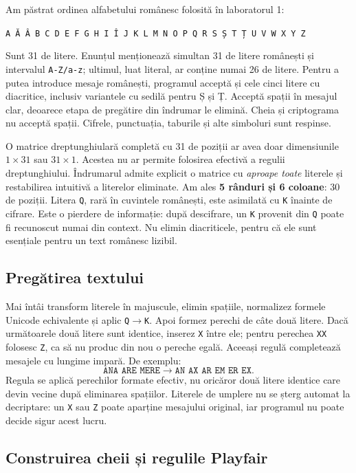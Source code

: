 \documentclass[12pt,a4paper]{article}
\begin{document}
Am păstrat ordinea alfabetului românesc folosită în laboratorul 1:
\begin{center}
\small\texttt{A Ă Â B C D E F G H I Î J K L M N O P Q R S Ș T Ț U V W X Y Z}
\end{center}
Sunt 31 de litere. Enunțul menționează simultan 31 de litere românești și intervalul
\texttt{A-Z/a-z}; ultimul, luat literal, ar conține numai 26 de litere. Pentru a putea
introduce mesaje românești, programul acceptă și cele cinci litere cu diacritice,
inclusiv variantele cu sedilă pentru Ș și Ț. Acceptă spații în mesajul clar,
deoarece etapa de pregătire din îndrumar le elimină. Cheia și criptograma nu
acceptă spații. Cifrele, punctuația, taburile și alte simboluri sunt respinse.

O matrice dreptunghiulară completă cu 31 de poziții ar avea doar dimensiunile
$1\times31$ sau $31\times1$. Acestea nu ar permite folosirea efectivă a regulii
dreptunghiului. Îndrumarul admite explicit o matrice cu \emph{aproape toate}
literele și restabilirea intuitivă a literelor eliminate. Am ales \textbf{5 rânduri
și 6 coloane}: 30 de poziții. Litera \texttt{Q}, rară în cuvintele românești,
este asimilată cu \texttt{K} înainte de cifrare. Este o pierdere de informație:
după descifrare, un \texttt{K} provenit din \texttt{Q} poate fi recunoscut numai din
context. Nu elimin diacriticele, pentru că ele sunt esențiale pentru un text
românesc lizibil.

\subsection{Pregătirea textului}

Mai întâi transform literele în majuscule, elimin spațiile, normalizez formele
Unicode echivalente și aplic \texttt{Q}$\to$\texttt{K}. Apoi formez perechi de câte
două litere. Dacă următoarele două litere sunt identice, inserez \texttt{X} între
ele; pentru perechea \texttt{XX} folosesc \texttt{Z}, ca să nu produc din nou o
pereche egală. Aceeași regulă completează mesajele cu lungime impară. De exemplu:
\[
\texttt{ANA ARE MERE}\longrightarrow\texttt{AN AX AR EM ER EX}.
\]
Regula se aplică perechilor formate efectiv, nu oricăror două litere identice
care devin vecine după eliminarea spațiilor. Literele de umplere nu se șterg
automat la decriptare: un \texttt{X} sau \texttt{Z} poate aparține mesajului
original, iar programul nu poate decide sigur acest lucru.

\subsection{Construirea cheii și regulile Playfair}
\end{document}
